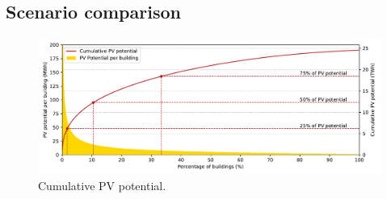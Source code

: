 \subsection{Scenario comparison}
\label{scenario_compare}

\begin{figure}[tb]
\centering
\includegraphics[width=\linewidth]{images/Figs/Cumulative_PV_potential.pdf}
\caption{Cumulative PV potential.}
\label{fig:PV_cumulative}
\end{figure}


